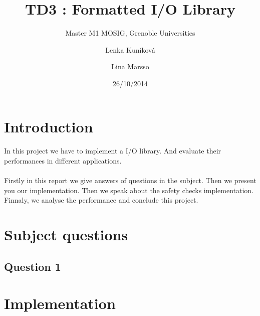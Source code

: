 \documentclass[a4paper,10pt]{article}
\title{TD3 : Formatted I/O Library}
\subtitle{Master M1 MOSIG, Grenoble Universities}
\author{Lenka Kun\'{i}kov\'{a} \and Lina Marsso}
\date{26/10/2014}
\begin{document}


\maketitle



\section{Introduction}
	\paragraph{}
	In this project we have to implement a I/O  library. 
	And evaluate their performances in different applications.
	\paragraph{}
	Firstly in this report we give answers of questions in the subject. 
	Then we present you our implementation.
	Then we speak about the safety checks implementation. 
	Finnaly, we analyse the performance and conclude this project.

\section{Subject questions}
\subsection{Question 1}


\section{Implementation}	
\end{document}
